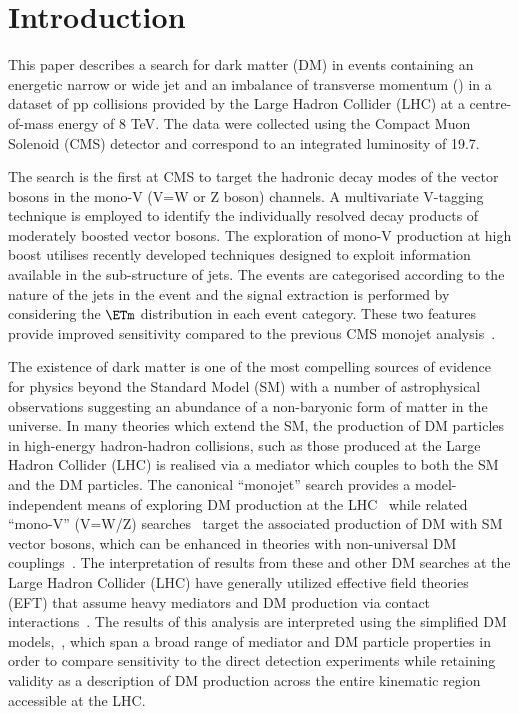 \section{Introduction}
This paper describes a search for dark matter (DM) in events containing an energetic narrow or wide jet and an imbalance of transverse momentum (\ETm) in a dataset 
of pp collisions provided by the Large Hadron Collider (LHC) at a centre-of-mass energy of 8 TeV. The data were collected using the Compact Muon Solenoid (CMS) 
detector and correspond to an integrated luminosity of 19.7\fbinv. 

The search is the first at CMS to target the hadronic decay modes of the vector bosons in the mono-V (V=W or Z boson) channels. A multivariate V-tagging technique is 
employed to identify the individually resolved decay products of moderately boosted vector bosons. The exploration of mono-V production at high boost 
utilises recently developed techniques designed to exploit information 
available in the sub-structure of jets. The events are categorised according to the nature of the jets in the event and the signal extraction is performed by 
considering the $\ETm$ distribution in each event category. These two features provide improved sensitivity compared to the previous CMS monojet analysis~\cite{monojet1}. 

The existence of dark matter is one of the most compelling sources of evidence for physics beyond the Standard Model (SM) with a number of astrophysical observations 
suggesting an abundance of a non-baryonic form of matter in the universe. In many theories which extend the SM, the production of DM particles in high-energy hadron-hadron 
collisions, such as those produced at the Large Hadron Collider (LHC) is realised via a mediator which couples to both the SM and the DM particles.  
The canonical ``monojet'' search provides a model-independent means of exploring DM production at the LHC~\cite{monojet1,monojet2} while 
related ``mono-V'' (V=W/Z) searches~\cite{monolep,monoZHbb,Aad:2014vka,Aad:2013oja} target the associated production of DM with SM vector bosons, 
which can be enhanced in theories with non-universal DM couplings~\cite{IVDM}.  The interpretation of results from these and other DM searches at 
the Large Hadron Collider (LHC) have generally utilized effective field theories (EFT) that assume heavy mediators and DM production via contact interactions~\cite{Fox:2011pm}.  
The results of this analysis are interpreted using the simplified DM models,~\cite{simplified1,Buchmueller:2013dya}, which span a broad range of 
mediator and DM particle properties in order to compare sensitivity to the direct detection experiments while retaining validity as a description of DM 
production across the entire kinematic region accessible at the LHC. 

